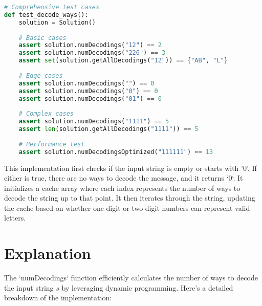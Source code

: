 \begin{fullwidth}
\begin{lstlisting}[language=Python]
# Comprehensive test cases
def test_decode_ways():
    solution = Solution()
    
    # Basic cases
    assert solution.numDecodings("12") == 2
    assert solution.numDecodings("226") == 3
    assert set(solution.getAllDecodings("12")) == {"AB", "L"}
    
    # Edge cases
    assert solution.numDecodings("") == 0
    assert solution.numDecodings("0") == 0
    assert solution.numDecodings("01") == 0
    
    # Complex cases
    assert solution.numDecodings("1111") == 5
    assert len(solution.getAllDecodings("1111")) == 5
    
    # Performance test
    assert solution.numDecodingsOptimized("111111") == 13
\end{lstlisting}
\end{fullwidth}

This implementation first checks if the input string is empty or starts with '0'. If either is true, there are no ways to decode the message, and it returns `0`. It initializes a cache array where each index represents the number of ways to decode the string up to that point. It then iterates through the string, updating the cache based on whether one-digit or two-digit numbers can represent valid letters.

\section*{Explanation}

The `numDecodings` function efficiently calculates the number of ways to decode the input string \( s \) by leveraging dynamic programming. Here's a detailed breakdown of the implementation:

